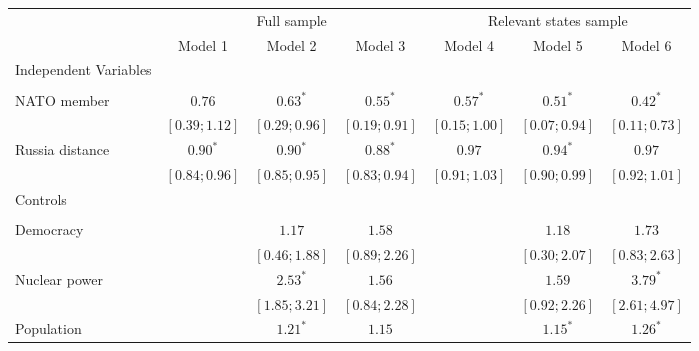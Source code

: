 
\begin{table}[h]
\begin{center}
\begin{tabular}{l c c c c c c}
\hline
 & \multicolumn{3}{c}{Full sample} & \multicolumn{3}{c}{Relevant states sample} \\
\cline{2-4} \cline{5-7}
 & Model 1 & Model 2 & Model 3 & Model 4 & Model 5 & Model 6 \\
\hline
Independent Variables &                 &                 &                 &                 &                 &                 \\
                      &                 &                 &                 &                 &                 &                 \\
\quad NATO member     & $0.76$          & $0.63^{*}$      & $0.55^{*}$      & $0.57^{*}$      & $0.51^{*}$      & $0.42^{*}$      \\
                      & $ [0.39; 1.12]$ & $ [0.29; 0.96]$ & $ [0.19; 0.91]$ & $ [0.15; 1.00]$ & $ [0.07; 0.94]$ & $ [0.11; 0.73]$ \\
\quad Russia distance & $0.90^{*}$      & $0.90^{*}$      & $0.88^{*}$      & $0.97$          & $0.94^{*}$      & $0.97$          \\
                      & $ [0.84; 0.96]$ & $ [0.85; 0.95]$ & $ [0.83; 0.94]$ & $ [0.91; 1.03]$ & $ [0.90; 0.99]$ & $ [0.92; 1.01]$ \\
Controls              &                 &                 &                 &                 &                 &                 \\
                      &                 &                 &                 &                 &                 &                 \\
\quad Democracy       &                 & $1.17$          & $1.58$          &                 & $1.18$          & $1.73$          \\
                      &                 & $ [0.46; 1.88]$ & $ [0.89; 2.26]$ &                 & $ [0.30; 2.07]$ & $ [0.83; 2.63]$ \\
\quad Nuclear power   &                 & $2.53^{*}$      & $1.56$          &                 & $1.59$          & $3.79^{*}$      \\
                      &                 & $ [1.85; 3.21]$ & $ [0.84; 2.28]$ &                 & $ [0.92; 2.26]$ & $ [2.61; 4.97]$ \\
\quad Population      &                 & $1.21^{*}$      & $1.15$          &                 & $1.15^{*}$      & $1.26^{*}$      \\

\end{tabular}
\end{center}
\end{table}
